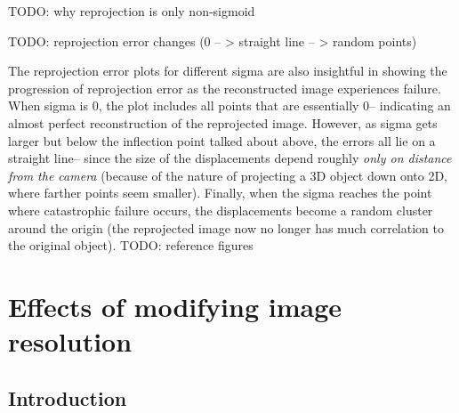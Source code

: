 \documentclass{article}
\begin{document}
TODO: why reprojection is only non-sigmoid



TODO: reprojection error changes (0 -- > straight line -- > random points)

The reprojection error plots for different sigma are also insightful in showing the progression of reprojection error as the reconstructed image experiences failure. When sigma is 0, the plot includes all points that are essentially 0-- indicating an almost perfect reconstruction of the reprojected image. However, as sigma gets larger but below the inflection point talked about above, the errors all lie on a straight line-- since the size of the displacements depend roughly \textit{only on distance from the camera} (because of the nature of projecting a 3D object down onto 2D, where farther points seem smaller). Finally, when the sigma reaches the point where catastrophic failure occurs, the displacements become a random cluster around the origin (the reprojected image now no longer has much correlation to the original object). TODO: reference figures









\section{Effects of modifying image resolution}

\subsection{Introduction}
\end{document}
